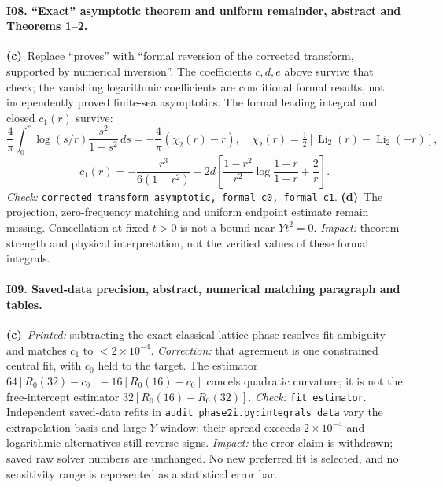 \documentclass[11pt,a4paper]{article}
\newcommand{\C}{\textbf{(c)}\ }
\newcommand{\D}{\textbf{(d)}\ }
\newcommand{\file}[1]{\nolinkurl{#1}}
\newcommand{\test}[1]{\textit{Check:} \file{#1}.}
\begin{document}
\paragraph{I08. ``Exact'' asymptotic theorem and uniform remainder, abstract and Theorems 1--2.}
\C Replace ``proves'' with ``formal reversion of the corrected transform,
supported by numerical inversion''. The coefficients $c,d,e$ above survive
that check; the vanishing logarithmic coefficients are conditional formal
results, not independently proved finite-sea asymptotics.
The formal leading integral and closed $c_1(r)$ survive:
\[
 \frac4\pi\int_0^r\log(s/r)\frac{s^2}{1-s^2}\,ds
 =-\frac4\pi(\chi_2(r)-r),\quad
 \chi_2(r)=\tfrac12[\operatorname{Li}_2(r)-\operatorname{Li}_2(-r)],
\]
\[
 c_1(r)=-\frac{r^3}{6(1-r^2)}
 -2d\left[\frac{1-r^2}{r^2}\log\frac{1-r}{1+r}+\frac2r\right].
\]
\test{corrected_transform_asymptotic, formal_c0, formal_c1}
\D The projection, zero-frequency matching and uniform endpoint estimate
remain missing. Cancellation at fixed $t>0$ is not a bound near $Yt^2=0$.
\textit{Impact:} theorem strength and physical interpretation, not the
verified values of these formal integrals.

\paragraph{I09. Saved-data precision, abstract, numerical matching paragraph and tables.}
\C \textit{Printed:} subtracting the exact classical lattice phase resolves
fit ambiguity and matches $c_1$ to $<2\times10^{-4}$.
\textit{Correction:} that agreement is one constrained central fit, with
$c_0$ held to the target. The estimator
$64[R_0(32)-c_0]-16[R_0(16)-c_0]$ cancels quadratic curvature; it is not
the free-intercept estimator $32[R_0(16)-R_0(32)]$.
\test{fit_estimator} Independent saved-data refits in
\file{audit_phase2i.py:integrals_data} vary the extrapolation basis and
large-$Y$ window; their spread exceeds $2\times10^{-4}$ and logarithmic
alternatives still reverse signs. \textit{Impact:} the error claim is
withdrawn; saved raw solver numbers are unchanged. No new preferred fit is
selected, and no sensitivity range is represented as a statistical error bar.
\end{document}
